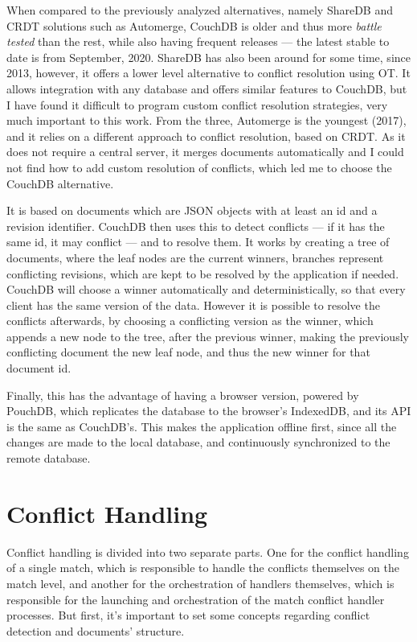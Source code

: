 When compared to the previously analyzed alternatives, namely ShareDB and CRDT solutions such as Automerge, CouchDB is older and thus more \textit{battle tested} than the rest, while also having frequent releases --- the latest stable to date is from September, 2020. ShareDB has also been around for some time, since 2013, however, it offers a lower level alternative to conflict resolution using OT. It allows integration with any database and offers similar features to CouchDB, but I have found it difficult to program custom conflict resolution strategies, very much important to this work. From the three, Automerge is the youngest (2017), and it relies on a different approach to conflict resolution, based on CRDT. As it does not require a central server, it merges documents automatically and I could not find how to add custom resolution of conflicts, which led me to choose the CouchDB alternative.

It is based on documents which are JSON objects with at least an id and a revision identifier. CouchDB then uses this to detect conflicts --- if it has the same id, it may conflict --- and to resolve them. It works by creating a tree of documents, where the leaf nodes are the current winners, branches represent conflicting revisions, which are kept to be resolved by the application if needed. CouchDB will choose a winner automatically and deterministically, so that every client has the same version of the data. However it is possible to resolve the conflicts afterwards, by choosing a conflicting version as the winner, which appends a new node to the tree, after the previous winner, making the previously conflicting document the new leaf node, and thus the new winner for that document id.

Finally, this has the advantage of having a browser version, powered by PouchDB, which replicates the database to the browser's IndexedDB, and its API is the same as CouchDB's. This makes the application offline first, since all the changes are made to the local database, and continuously synchronized to the remote database.

\section{Conflict Handling}

Conflict handling is divided into two separate parts. One for the conflict handling of a single match, which is responsible to handle the conflicts themselves on the match level, and another for the orchestration of handlers themselves, which is responsible for the launching and orchestration of the match conflict handler processes. But first, it's important to set some concepts regarding conflict detection and documents' structure.

